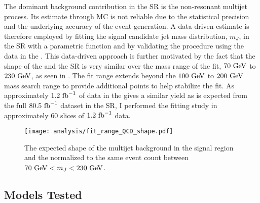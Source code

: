 The dominant background contribution in the SR is the non-resonant multijet process.
Its estimate through MC is not reliable due to the statistical precision and the underlying accuracy of the event generation.
A data-driven estimate is therefore employed by fitting the signal candidate \largeR{} jet mass distribution, $m_{J}$, in the SR with a parametric function and by validating the procedure using the data in the \CRQCD{}.
This data-driven approach is further motivated by the fact that the shape of the \CRQCD{} and the SR is very similar over the mass range of the fit, $70~\mathrm{GeV}$ to $230~\mathrm{GeV}$, as seen in .
The fit range extends beyond the $100~\mathrm{GeV}$ to $200~\mathrm{GeV}$ mass search range to provide additional points to help stabilize the fit.
As approximately $1.2~\mathrm{fb}^{-1}$ of data in the \CRQCD{} gives a similar yield as is expected from the full $80.5~\mathrm{fb}^{-1}$ dataset in the SR, I performed the fitting study in approximately 60 slices of $1.2~\mathrm{fb}^{-1}$ \CRQCD{} data.

\begin{figure}[htbp]
 \centering
 \texttt{[image: analysis/fit\_range\_QCD\_shape.pdf]}
 \caption[Comparison of the multijet background shape in the signal region and $0$-tag control region (\CRQCD{}).]{%
  The expected shape of the multijet background in the signal region and the \CRQCD{} normalized to the same event count between $70~\mathrm{GeV} < m_{J} < 230~\mathrm{GeV}$.}
 \label{fig:fit_range_QCD_shape}
\end{figure}

\subsection{Models Tested}\label{sec:models_tested}

